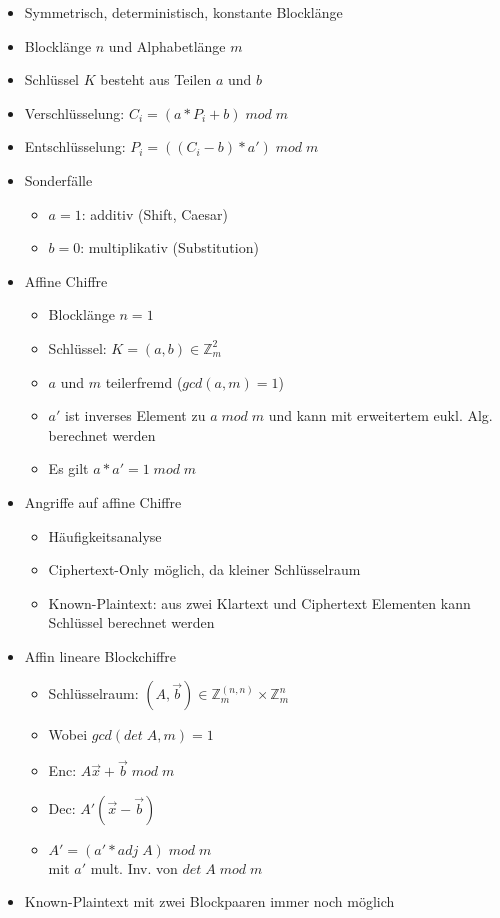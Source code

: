 \documentclass[11pt, paper=a4, twocolumn]{scrartcl}
\newcommand*{\Z}{\mathbb{Z}}
\begin{document}
		\begin{itemize}
			\item Symmetrisch, deterministisch, konstante Blocklänge
			\item Blocklänge $n$ und Alphabetlänge $m$
			\item Schlüssel $K$ besteht aus Teilen $a$ und $b$
			\item Verschlüsselung: $C_i=(a*P_i+b)\;mod\;m$
			\item Entschlüsselung: $P_i=((C_i-b)*a')\;mod\;m$
			\item Sonderfälle
				\begin{itemize}
					\item $a=1$: additiv (Shift, Caesar)
					\item $b=0$: multiplikativ (Substitution)
				\end{itemize}
			\item Affine Chiffre
				\begin{itemize}
					\item Blocklänge $n=1$
					\item Schlüssel: $K=(a,b)\in \Z_m^2$
					\item $a$ und $m$ teilerfremd ($gcd(a,m)=1$)
					\item $a'$ ist inverses Element zu $a\;mod\;m$ und kann mit erweitertem eukl. Alg. berechnet werden
					\item Es gilt $a*a'=1\;mod\;m$
				\end{itemize}
			\item Angriffe auf affine Chiffre
				\begin{itemize}
					\item Häufigkeitsanalyse
					\item Ciphertext-Only möglich, da kleiner Schlüsselraum
					\item Known-Plaintext: aus zwei Klartext und Ciphertext Elementen kann Schlüssel berechnet werden
				\end{itemize}
			\item Affin lineare Blockchiffre
				\begin{itemize}
					\item Schlüsselraum: $(A,\vec{b})\in \Z_m^{(n,n)}\times \Z_m^n$
					\item Wobei $gcd(det\;A,m)=1$
					\item Enc: $A\vec{x}+\vec{b}\;mod\;m$
					\item Dec: $A'(\vec{x}-\vec{b})$
					\item $A'=(a'*adj\;A)\;mod\;m$\\
						mit $a'$ mult. Inv. von $det\;A\;mod\;m$
				\end{itemize}
			\item Known-Plaintext mit zwei Blockpaaren immer noch möglich
		\end{itemize}
	
\end{document}
